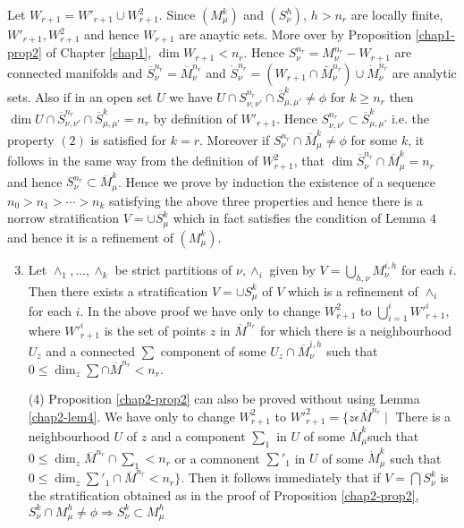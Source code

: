 Let $W_{r+1} = W'_{r+1} \cup W^2_{r+1}$. Since $(M^k_\mu)$ and
$(S^h_\nu)$, $h > n_r$ are locally finite, $W'_{r+1}, W^2_{r+1}$ and
hence $W_{r+1}$ are anaytic sets. More over by Proposition \ref{chap1-prop2} of
Chapter \ref{chap1}, $\dim W_{r+1}< n_r$. Hence $S^{n_r}_\nu = M^{n_r}_\nu -
W_{r+1}$ are connected manifolds and $\overline{S}^{n_r}_\nu =
\overline{M}^{n_r}_\nu$ and $\dot{S}^{n_r}_\nu = (W_{r+1}\cap
\bar{M}^{n_r}_\nu) \cup \dot{M}^{n_r}_\nu$ are analytic sets. Also if
in an open set $U$ we have $U \cap S^{n_r}_{\nu,\nu'} \cap
\overline{S}^k_{\mu,\mu'}\neq \phi$ for $k \geq n_r$ then $\dim U \cap
\overline{S}^{n_r}_{\nu,\nu'} \cap \overline{S}^k_{\mu,\mu'} = n_r$ by
definition of $W'_{r+1}$. Hence $S^{n_r}_{\nu,\nu'}\subset
\overline{S}^k_{\mu,\mu'}$ i.e. the property $(2)$ is satisfied for $k
= r$. Moreover if $S^{n_r}_\nu \cap \overline{M}^{k}_\mu \neq \phi$
for some $k$, it follows in the same way from the definition of
$W^2_{r+1}$, that $\dim \overline{S}^{n_r}_\nu \cap \overline{M}^k_\mu
= n_r$ and hence $S^{n_r}_\nu \subset \overline{M}^k_\mu$. Hence we
prove by induction the existence of a sequence $n_0 > n_1 > \cdots >
n_k$ satisfying the above three properties and hence there is a norrow
stratification $V = \cup S^k_\mu$ which in fact satisfies the
condition of Lemma $4$ and hence it is a refinement of $(M^k_\mu)$.  

\begin{remark*} %
  \begin{enumerate}[(3)]
    \setcounter{enumi}{2}
  \item Let $\wedge_1 ,\ldots, \wedge_k$ be strict partitions of
    $\nu, \wedge_i$ given by $V =\bigcup\limits_{h,\nu}M^{i,h}_\nu$
    for each $i$. Then there exists a stratification $V = \cup
    S^k_\mu$\pageoriginale 
    of $V$ which is a refinement of $\wedge_i$ for each $i$. In the
    above proof we have only to change $W^2_{r+1}$ to $\bigcup \limits
    ^i_{i=1}{W'}^i_{r+1}$, where ${W'}^i_{r+1}$ is the set of points $z$
    in $\overline{M}^{n_r}$ for which there is a neighbourhood $U_z$
    and a connected $\sum$ component of some $U_z \cap
    \overline{M}^{i,h}_\nu$ such that $0 \leq \dim_z \sum \cap
    \overline{M}^{n_r} < n_r$. 

\item[(4)] Proposition \ref{chap2-prop2} can also be proved without using Lemma
    \ref{chap2-lem4}. We have only to change $W^2_{r+1}$ to
    $W'^{2}_{r+1} = \bigg\{z 
    \epsilon \overline{M}^{n_r}\mid$ There is a neighbourhood $U$ of
    $z$ and a component $\sum_1$ in $U$ of some
    $\overline{M}^k_\mu$such that $0\leq \dim_z \overline{M}^{n_r}
    \cap \sum_1 < n_r$ or a comnonent $\sum'_1$ in $U$ of some
    $\dot{M}^k_\mu$ such that $0 \leq \dim_z \sum'_1 \cap
    \overline{M}^{n_r} < n_r\bigg\}$. Then it follows immediately that
    if $V = \bigcap S^k_\nu$ is the stratification obtained as in the
    proof of Proposition \ref{chap2-prop2}, $S^k_\nu \cap M^h_\mu \neq
    \phi \Rightarrow S^k_\nu \subset M^h_\mu$ 
  \end{enumerate}
\end{remark*}

